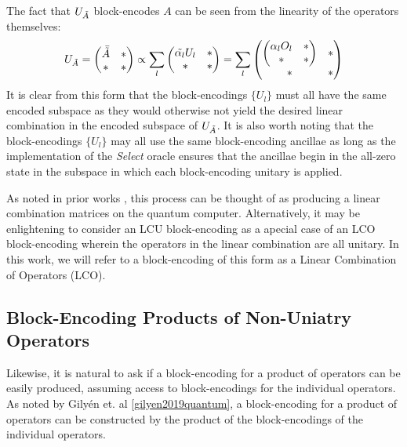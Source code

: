 The fact that $U_{\Tilde{A}}$ block-encodes $A$ can be seen from the linearity of the operators themselves:
\begin{equation}
    U_{\Tilde{A}} = 
    \begin{pmatrix}
    \bar{\Tilde{A}} & * \\
    * & * 
    \end{pmatrix} \propto
    \sum_{l}
    \begin{pmatrix}
    \Tilde{\alpha_l} U_l & * \\
    * & * 
    \end{pmatrix} =
    \sum_{l}
    \begin{pmatrix}
    \begin{pmatrix}
        \alpha_l O_l & * \\
        * & * 
    \end{pmatrix} & * \\
    * & * 
    \end{pmatrix} 
\end{equation}
It is clear from this form that the block-encodings $\{U_l\}$ must all have the same encoded subspace as they would otherwise not yield the desired linear combination in the encoded subspace of $U_{\Tilde{A}}$.
It is also worth noting that the block-encodings $\{U_l\}$ may all use the same block-encoding ancillae as long as the implementation of the \textit{Select} oracle ensures that the ancillae begin in the all-zero state in the subspace in which each block-encoding unitary is applied.

As noted in prior works \cite{berry2015simulating, childs2017quantum, gilyen2019quantum, lin2022lecture, jennings2023efficient}, this process can be thought of as producing a linear combination matrices on the quantum computer.
Alternatively, it may be enlightening to consider an LCU block-encoding as a apecial case of an LCO block-encoding wherein the operators in the linear combination are all unitary.
In this work, we will refer to a block-encoding of this form as a Linear Combination of Operators (LCO).

\subsection{Block-Encoding Products of Non-Uniatry Operators}
\label{subsec:be-products}

Likewise, it is natural to ask if a block-encoding for a product of operators can be easily produced, assuming access to block-encodings for the individual operators.
As noted by Gilyén et. al \ref{gilyen2019quantum}, a block-encoding for a product of operators can be constructed by the product of the block-encodings of the individual operators.

